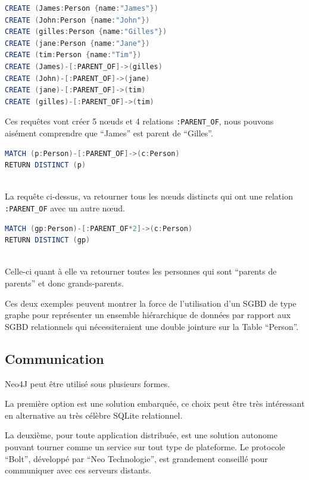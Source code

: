 \documentclass[a4paper,fleqn,12pt,oneside]{report}
\begin{document}
\begin{lstlisting}[language=java, frame=single]
CREATE (James:Person {name:"James"})
CREATE (John:Person {name:"John"})
CREATE (gilles:Person {name:"Gilles"})
CREATE (jane:Person {name:"Jane"})
CREATE (tim:Person {name:"Tim"})
CREATE (James)-[:PARENT_OF]->(gilles)
CREATE (John)-[:PARENT_OF]->(jane)
CREATE (jane)-[:PARENT_OF]->(tim)
CREATE (gilles)-[:PARENT_OF]->(tim)
\end{lstlisting}
\newpage

Ces requêtes vont créer 5 nœuds et 4 relations \texttt{:PARENT\_OF}, nous pouvons aisément comprendre que \enquote{James} est parent de \enquote{Gilles}.

\begin{lstlisting}[language=java, frame=single]
MATCH (p:Person)-[:PARENT_OF]->(c:Person) 
RETURN DISTINCT (p)
	
\end{lstlisting}

La requête ci-dessus, va retourner tous les nœuds distincts qui ont une relation \texttt{:PARENT\_OF} avec un autre nœud.

\begin{lstlisting}[language=java, frame=single]
MATCH (gp:Person)-[:PARENT_OF*2]->(c:Person) 
RETURN DISTINCT (gp)
	
\end{lstlisting}

Celle-ci quant à elle va retourner toutes les personnes qui sont \enquote{parents de parents} et donc grands-parents. 

Ces deux exemples peuvent montrer la force de l’utilisation d’un SGBD de type graphe pour représenter un ensemble hiérarchique de données par rapport aux SGBD relationnels qui nécessiteraient une double jointure sur la Table \enquote{Person}.

\subsection{Communication}

Neo4J peut être utilisé sous plusieurs formes.

La première option est une solution embarquée, ce choix peut être très intéressant en alternative au très célèbre SQLite relationnel.

La deuxième, pour toute application distribuée, est une solution autonome pouvant tourner comme un service sur tout type de plateforme. Le protocole \enquote{Bolt}, développé par \enquote{Neo Technologie}, est grandement conseillé pour communiquer avec ces serveurs distants.
\end{document}

